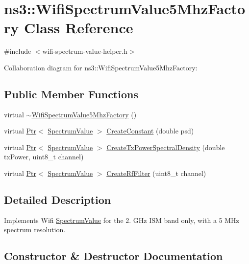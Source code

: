 \hypertarget{classns3_1_1WifiSpectrumValue5MhzFactory}{}\section{ns3\+:\+:Wifi\+Spectrum\+Value5\+Mhz\+Factory Class Reference}
\label{classns3_1_1WifiSpectrumValue5MhzFactory}


{\ttfamily \#include $<$wifi-\/spectrum-\/value-\/helper.\+h$>$}



Collaboration diagram for ns3\+:\+:Wifi\+Spectrum\+Value5\+Mhz\+Factory\+:
\subsection*{Public Member Functions}
\begin{DoxyCompactItemize}
\item 
virtual \hyperlink{classns3_1_1WifiSpectrumValue5MhzFactory_aabc9a38a075a7a394d99c665bf70c463}{$\sim$\+Wifi\+Spectrum\+Value5\+Mhz\+Factory} ()
\item 
virtual \hyperlink{classns3_1_1Ptr}{Ptr}$<$ \hyperlink{classns3_1_1SpectrumValue}{Spectrum\+Value} $>$ \hyperlink{classns3_1_1WifiSpectrumValue5MhzFactory_a32a04dc83a836da0fcfcc387cabc097f}{Create\+Constant} (double psd)
\item 
virtual \hyperlink{classns3_1_1Ptr}{Ptr}$<$ \hyperlink{classns3_1_1SpectrumValue}{Spectrum\+Value} $>$ \hyperlink{classns3_1_1WifiSpectrumValue5MhzFactory_aa3045151889d535e6e7bf40e0855a92f}{Create\+Tx\+Power\+Spectral\+Density} (double tx\+Power, uint8\+\_\+t channel)
\item 
virtual \hyperlink{classns3_1_1Ptr}{Ptr}$<$ \hyperlink{classns3_1_1SpectrumValue}{Spectrum\+Value} $>$ \hyperlink{classns3_1_1WifiSpectrumValue5MhzFactory_a96a617d676000c1a83f3f969b2f138a5}{Create\+Rf\+Filter} (uint8\+\_\+t channel)
\end{DoxyCompactItemize}


\subsection{Detailed Description}
Implements Wifi \hyperlink{classns3_1_1SpectrumValue}{Spectrum\+Value} for the 2. G\+Hz I\+SM band only, with a 5 M\+Hz spectrum resolution. 

\subsection{Constructor \& Destructor Documentation}
